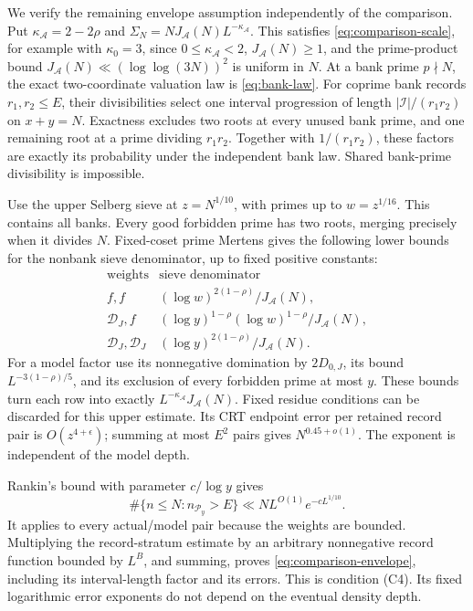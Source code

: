 We verify the remaining envelope assumption independently of the
comparison. Put \(\kappa_{\mathscr A}=2-2\rho\) and
\(\Sigma_N=NJ_{\mathscr A}(N)L^{-\kappa_{\mathscr A}}\). This satisfies
\eqref{eq:comparison-scale}, for example with \(\kappa_0=3\), since
\(0\le\kappa_{\mathscr A}<2\), \(J_{\mathscr A}(N)\ge1\), and the prime-product bound
\(J_{\mathscr A}(N)\ll(\log\log(3N))^2\) is uniform in \(N\).
At a bank prime \(p\nmid N\),
the exact two-coordinate valuation law is \eqref{eq:bank-law}.
For coprime bank records \(r_1,r_2\le E\), their divisibilities
select one interval progression of length
\(|\mathcal I|/(r_1r_2)\) on \(x+y=N\).
Exactness excludes two roots at every unused bank prime, and one
remaining root at a prime dividing \(r_1r_2\). Together with
\(1/(r_1r_2)\), these factors are exactly its probability under
the independent bank law. Shared bank-prime divisibility is impossible.

Use the upper Selberg sieve at \(z=N^{1/10}\), with primes up to
\(w=z^{1/16}\). This contains all banks. Every good forbidden prime
has two roots, merging precisely when it divides \(N\). Fixed-coset
prime Mertens gives the following lower bounds for the nonbank
sieve denominator, up to fixed positive constants:
\[
\begin{array}{c|c}
 \text{weights}&\text{sieve denominator}\\ \hline
 f,f&(\log w)^{2(1-\rho)}/J_{\mathscr A}(N),\\
 \mathcal D_J,f&(\log y)^{1-\rho}(\log w)^{1-\rho}/J_{\mathscr A}(N),\\
 \mathcal D_J,\mathcal D_J&(\log y)^{2(1-\rho)}/J_{\mathscr A}(N).
\end{array}
\]
For a model factor use its nonnegative domination by \(2D_{0,J}\),
its bound \(L^{-3(1-\rho)/5}\), and its exclusion of every forbidden
prime at most \(y\). These bounds turn each row into exactly
\(L^{-\kappa_{\mathscr A}}J_{\mathscr A}(N)\). Fixed residue conditions can be discarded
for this upper estimate. Its CRT endpoint error per retained record
pair is \(O(z^{4+\epsilon})\); summing at most \(E^2\) pairs gives
\(N^{0.45+o(1)}\). The exponent is independent of the model depth.

Rankin's bound with parameter \(c/\log y\) gives
\[
 \#\{n\le N:n_{\mathcal P_y}>E\}
                 \ll NL^{O(1)}e^{-cL^{1/10}}.
\]
It applies to every actual/model pair because the weights are
bounded. Multiplying the record-stratum estimate by an arbitrary
nonnegative record function bounded by \(L^B\), and summing, proves
\eqref{eq:comparison-envelope}, including its interval-length factor
and its errors. This is condition (C4). Its fixed logarithmic error
exponents do not depend on the eventual density depth.

